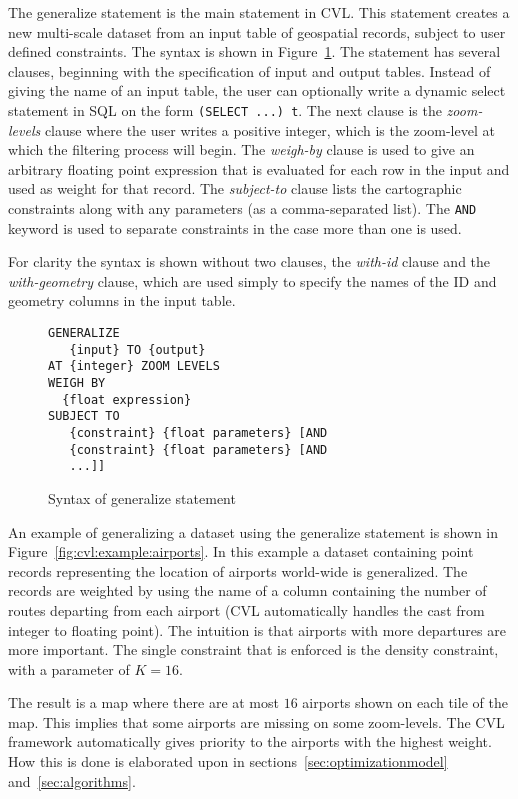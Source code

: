 The generalize statement is the main statement in CVL. This statement creates a new multi-scale dataset from an input table of geospatial records, subject to user defined constraints. The syntax is shown in Figure~\ref{fig:generalize:syntax}. The statement has several clauses, beginning with the specification of input and output tables. Instead of giving the name of an input table, the user can optionally write a dynamic select statement in SQL on the form \texttt{(SELECT ...) t}. The next clause is the \emph{zoom-levels} clause where the user writes a positive integer, which is the zoom-level  at which the filtering process will begin. The \emph{weigh-by} clause is used to give an arbitrary floating point expression that is evaluated for each row in the input and used as weight for that record. The \emph{subject-to} clause lists the cartographic constraints along with any parameters (as a comma-separated list). The \texttt{AND} keyword is used to separate constraints in the case more than one is used.

For clarity the syntax is shown without two clauses, the \emph{with-id} clause and the \emph{with-geometry} clause, which are used simply to specify the names of the ID and geometry columns in the input table.

\begin{figure}[htbp]
\begin{center}
\begin{lstlisting}
GENERALIZE 
   {input} TO {output}
AT {integer} ZOOM LEVELS
WEIGH BY
  {float expression}
SUBJECT TO 
   {constraint} {float parameters} [AND
   {constraint} {float parameters} [AND
   ...]]
\end{lstlisting}
\caption{Syntax of generalize statement}
\label{fig:generalize:syntax}
\end{center}
\end{figure}

An example of generalizing a dataset using the generalize statement is shown in Figure~\ref{fig:cvl:example:airports}. In this example a dataset containing point records representing the location of airports world-wide is generalized. The records are weighted by using the name of a column containing the number of routes departing from each airport (CVL automatically handles the cast from integer to floating point). The intuition is that airports with more departures are more important. The single constraint that is enforced is the density constraint, with a parameter of $K=16$.

The result is a map where there are at most $16$ airports shown on each tile of the map. This implies that some airports are missing on some zoom-levels. The CVL framework automatically gives priority to the airports with the highest weight. How this is done is elaborated upon in sections~\ref{sec:optimizationmodel} and~\ref{sec:algorithms}.

